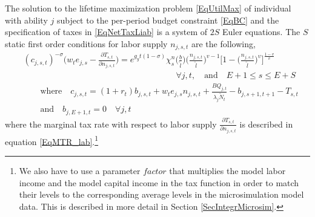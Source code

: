 \documentclass[letterpaper,12pt]{article}
\theoremstyle{definition}
\begin{document}
\begin{spacing}{1.5}
    The solution to the lifetime maximization problem \eqref{EqUtilMax} of individual with ability $j$ subject to the per-period budget constraint \eqref{EqBC} and the specification of taxes in \eqref{EqNetTaxLiab} is a system of $2S$ Euler equations. The $S$ static first order conditions for labor supply $n_{j,s,t}$ are the following,
    \begin{equation}\label{EqEulerLabGen}
      \begin{split}
        &(c_{j,s,t})^{-\sigma}\Biggl(w_t e_{j,s} - \frac{\partial T_{s,t}}{\partial n_{j,s,t}}\Biggr) = e^{g_y t(1-\sigma)}\chi^n_{s}\biggl(\frac{b}{\tilde{l}}\biggr)\biggl(\frac{n_{j,s,t}}{\tilde{l}}\biggr)^{v-1}\Biggl[1 - \biggl(\frac{n_{j,s,t}}{\tilde{l}}\biggr)^\upsilon\Biggr]^{\frac{1-v}{v}} \\
        &\qquad\qquad\qquad\qquad\qquad\qquad\qquad\qquad\qquad\forall j,t, \quad\text{and}\quad E+1\leq s\leq E+S \\
        &\qquad\text{where}\quad c_{j,s,t} = \left(1 + r_t\right) b_{j,s,t} + w_t e_{j,s}n_{j,s,t} + \frac{BQ_{j,t}}{\lambda_j\tilde{N}_t} - b_{j,s+1,t+1} - T_{s,t} \\
        &\qquad\text{and}\quad b_{j,E+1,t} = 0 \quad\forall j,t
      \end{split}
    \end{equation}
    where the marginal tax rate with respect to labor supply $\frac{\partial T_{s,t}}{\partial n_{j,s,t}}$ is described in equation \eqref{EqMTR_lab}.\footnote{We also have to use a parameter $factor$ that multiplies the model labor income and the model capital income in the tax function in order to match their levels to the corresponding average levels in the microsimulation model data. This is described in more detail in Section \ref{SecIntegrMicrosim}.}


\end{spacing}
\end{document}
